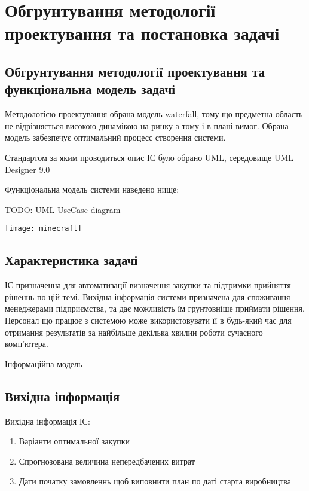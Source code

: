 \chapter{Обгрунтування методології проектування та постановка задачі}
\label{chap:second}

\section{Обгрунтування методології проектування та функціональна модель задачі}

Методологією проектування обрана модель waterfall, тому що предметна область не відрізняється високою динамікою на ринку а тому і в плані вимог. Обрана модель забезпечує оптимальний процесс створення системи.

Стандартом за яким проводиться опис ІС було обрано UML, середовище UML Designer 9.0

Функціональна модель системи наведено нище:

TODO: UML UseCase diagram

\begin{center}

\texttt{[image: minecraft]}

\end{center}

\section{Характеристика задачі}

ІС призначенна для автоматизації визначення закупки та підтримки прийняття рішеннь по цій темі. Вихідна інформація системи призначена для споживання менеджерами підприємства, та дає  можливість їм грунтовніше приймати рішення. Персонал що працює з системою може використовувати її в будь-який час для отримання результатів за найбільше декілька хвилин роботи сучасного комп'ютера.

Інформаційна модель

\section{Вихідна інформація}

Вихідна інформація ІС: 

\begin{enumerate}
	\item Варіанти оптимальної закупки
	\item Спрогнозована величина непередбачених витрат
	\item Дати початку замовленнь щоб виповнити план по даті старта виробництва
\end{enumerate}

